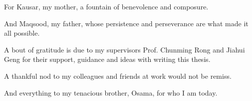 
\acknowledgements
For Kausar, my mother, a fountain of benevolence and composure. 

\noindent And Maqsood, my father, whose persistence and perseverance are what made it all possible.

\noindent A bout of gratitude is due to my supervisors Prof. Chunming Rong and Jiahui Geng for their support, guidance and ideas with writing this thesis.

\noindent A thankful nod to my colleagues and friends at work would not be remiss.

\noindent And everything to my tenacious brother, Osama, for who I am today.